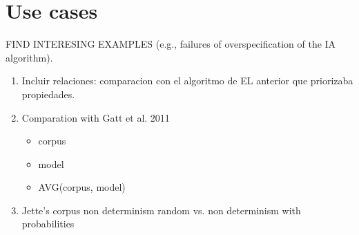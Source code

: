 \section{Use cases}\label{sec:usecases}


FIND INTERESING EXAMPLES (e.g., failures of overspecification of the IA algorithm). 

\begin{enumerate}

\item Incluir relaciones: comparacion con el algoritmo de EL anterior que priorizaba 
propiedades. 




\item Comparation with Gatt et al. 2011
\begin{itemize} 
  \item \pdisc corpus\pdisc
  \item \pdisc model\pdisc
  \item \pdisc AVG(corpus\pdisc, model\pdisc)
\end{itemize}
\item Jette's corpus non determinism random vs. non determinism with probabilities

\end{enumerate}
